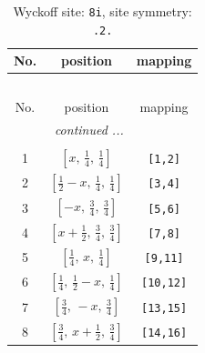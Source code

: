 \documentclass[fleqn,8pt]{jsarticle}
\begin{document}
\begin{longtable}{ccc}
\caption{Wyckoff site: {\tt 8i}, site symmetry: {\tt .2.}}
 \\
 \hline \hline
No. & position & mapping \\ \hline \endfirsthead

\multicolumn{2}{l}{\tablename\ \thetable{}} \\
 \hline \hline
No. & position & mapping \\ \hline \endhead

 \hline \hline
\multicolumn{2}{r}{\footnotesize\it continued ...} \\ \endfoot

 \hline \hline
\multicolumn{2}{r}{} \\ \endlastfoot

1 & $\left[ x,\, \frac{1}{4},\, \frac{1}{4} \right]$ & {\tt [1,2]} \\ \hline
2 & $\left[ \frac{1}{2} - x,\, \frac{1}{4},\, \frac{1}{4} \right]$ & {\tt [3,4]} \\ \hline
3 & $\left[ - x,\, \frac{3}{4},\, \frac{3}{4} \right]$ & {\tt [5,6]} \\ \hline
4 & $\left[ x + \frac{1}{2},\, \frac{3}{4},\, \frac{3}{4} \right]$ & {\tt [7,8]} \\ \hline
5 & $\left[ \frac{1}{4},\, x,\, \frac{1}{4} \right]$ & {\tt [9,11]} \\ \hline
6 & $\left[ \frac{1}{4},\, \frac{1}{2} - x,\, \frac{1}{4} \right]$ & {\tt [10,12]} \\ \hline
7 & $\left[ \frac{3}{4},\, - x,\, \frac{3}{4} \right]$ & {\tt [13,15]} \\ \hline
8 & $\left[ \frac{3}{4},\, x + \frac{1}{2},\, \frac{3}{4} \right]$ & {\tt [14,16]} \\
\end{longtable}
\renewcommand{\arraystretch}{1.2}
\end{document}
